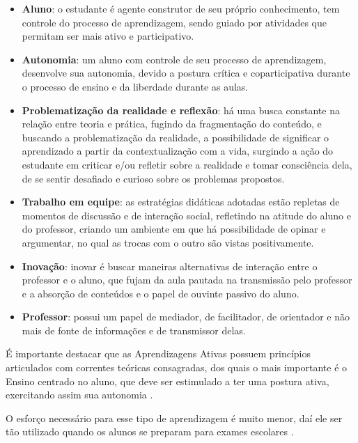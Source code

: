 \begin{citacao}
    \begin{itemize}
        \item \textbf{Aluno}: o estudante é agente construtor de seu próprio conhecimento, tem controle do processo de aprendizagem, sendo guiado por atividades que permitam ser mais ativo e participativo.
        \item \textbf{Autonomia}: um aluno com controle de seu processo de aprendizagem, desenvolve sua autonomia, devido a postura crítica e coparticipativa durante o processo de ensino e da liberdade durante as aulas.
        \item \textbf{Problematização da realidade e reflexão}: há uma busca constante na relação entre teoria e prática, fugindo da fragmentação do conteúdo, e buscando a problematização da realidade, a possibilidade de significar o aprendizado a partir da contextualização com a vida, surgindo a ação do estudante em criticar e/ou refletir sobre a realidade e tomar consciência dela, de se sentir desafiado e curioso sobre os problemas propostos.
        \item \textbf{Trabalho em equipe}: as estratégias didáticas adotadas estão repletas de momentos de discussão e de interação social, refletindo na atitude do aluno e do professor, criando um ambiente em que há possibilidade de opinar e argumentar, no qual as trocas com o outro são vistas positivamente.
        \item \textbf{Inovação}: inovar é buscar maneiras alternativas de interação entre o professor e o aluno, que fujam da aula pautada na transmissão pelo professor e a absorção de conteúdos e o papel de ouvinte passivo do aluno.
        \item \textbf{Professor}: possui um papel de mediador, de facilitador, de orientador e não mais de fonte de informações e de transmissor delas. \cite{Santos2022}
    \end{itemize}
\end{citacao}

\begin{citacao}
    É importante destacar que as Aprendizagens Ativas possuem princípios articulados com correntes teóricas consagradas, dos quais o mais importante é o Ensino centrado no aluno, que deve ser estimulado a ter uma postura ativa, exercitando assim sua autonomia \cite[p. 33]{SOUSA2022}.
\end{citacao}

O esforço necessário para esse tipo de aprendizagem é muito menor, daí ele ser tão utilizado quando os alunos se preparam para exames escolares \cite[p. 27]{SOUSA2022}.

